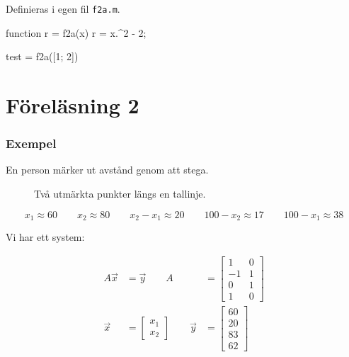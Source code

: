 \documentclass[a4paper,10pt,swedish]{memoir}
\numberwithin{equation}{subsection}
\begin{document}
Definieras i egen fil \verb:f2a.m:.

\begin{matlabcode}
function r = f2a(x)
    r = x.^2 - 2;

test = f2a([1; 2]) %
\end{matlabcode}

\newpage

\chapter{Föreläsning 2}

\subsection{Exempel}

En person märker ut avstånd genom att stega.

\begin{figure}[h]
\vspace{1cm}
\centering
{}
\caption{Två utmärkta punkter längs en tallinje.}
\end{figure}

\begin{equation}
x_1\approx 60 \qquad
x_2\approx 80 \qquad
x_2-x_1\approx 20 \qquad
100 - x_2\approx17 \qquad
100 - x_1 \approx38
\end{equation}

Vi har ett system:

\begin{align}
A\vec{x}&=\vec{y} \qquad
A &=
\left[ \begin{array}{cc}
1 & 0 \\
-1 & 1 \\
0 & 1 \\
1 & 0
\end{array}\right] \\
\vec{x} &= \left[\begin{array}{c}
x_1 \\
x_2
\end{array}\right] \qquad
\vec{y} &= \left[\begin{array}{c}
60 \\
20 \\
83 \\
62
\end{array}\right]
\end{align}
\end{document}
